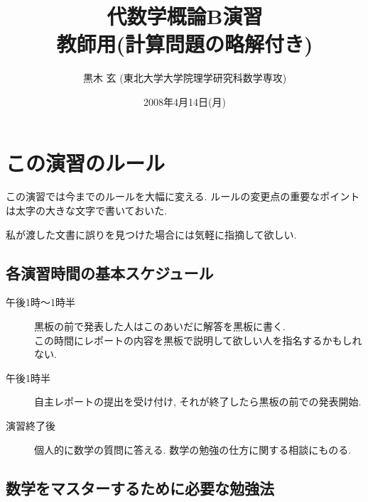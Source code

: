\documentclass[12pt,twoside]{jarticle}
\newcommand\commentout[1]{#1}
\newcommand\commentout[1]{}
\begin{document}
\title{\bf 代数学概論B演習
  \ifx\STUDENT\undefined\\{\normalsize 教師用\quad(計算問題の略解付き)}\fi}
\author{黒木 玄 \quad (東北大学大学院理学研究科数学専攻)}
\date{2008年4月14日(月)}
\maketitle
\tableofcontents
\setcounter{section}{-1}

\section{この演習のルール}

この演習では今までのルールを大幅に変える.
ルールの変更点の重要なポイントは太字の大きな文字で書いておいた.

私が渡した文書に誤りを見つけた場合には気軽に指摘して欲しい.

\subsection{各演習時間の基本スケジュール}

\begin{description}
 \item[午後1時〜1時半] 
  黒板の前で発表した人はこのあいだに解答を黒板に書く. \\
  この時間にレポートの内容を黒板で説明して欲しい人を指名するかもしれない.
 \item[午後1時半]
  自主レポートの提出を受け付け, それが終了したら黒板の前での発表開始.
 \item[演習終了後]
  個人的に数学の質問に答える. 
  数学の勉強の仕方に関する相談にものる.
\end{description}

\subsection{数学をマスターするために必要な勉強法}
\end{document}
